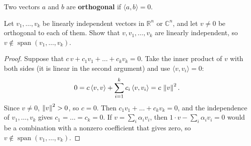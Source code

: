 \begin{definition}[Orthogonality]
    Two vectors $a$ and $b$ are \textbf{orthogonal} if $\langle a, b \rangle = 0$.
\end{definition}

\begin{exercisebox}
\begin{exercise}\label{ex:orth-ind-0917}\label{thm:orth-ind-0917}
    Let $v_1, \dots, v_k$ be linearly independent vectors in $\mathbb{R}^n$ or $\mathbb{C}^n$, and let
    $v \neq 0$ be orthogonal to each of them. Show that $v, v_1, \dots, v_k$ are linearly independent,
    so $v \notin \operatorname{span}(v_1, \dots, v_k)$.
\end{exercise}
\tcblower
\begin{proof}
    Suppose that $c \, v + c_1 v_1 + \dots + c_k v_k = 0$. Take the inner product of $v$ with
    both sides (it is linear in the second argument) and use $\langle v, v_i \rangle = 0$:
    \[0 = c \, \langle v, v \rangle + \sum_{i=1}^{k} c_i \, \langle v, v_i \rangle = c \, \left\lVert v \right\rVert^2.\]
    Since $v \neq 0$, $\left\lVert v \right\rVert^2 > 0$, so $c = 0$. Then $c_1 v_1 + \dots + c_k v_k = 0$, and
    the independence of $v_1, \dots, v_k$ gives $c_1 = \dots = c_k = 0$. If $v = \sum_{i} \alpha_i v_i$,
    then $1 \cdot v - \sum_{i} \alpha_i v_i = 0$ would be a combination with a nonzero coefficient
    that gives zero, so $v \notin \operatorname{span}(v_1, \dots, v_k)$.
\end{proof}
\end{exercisebox}

